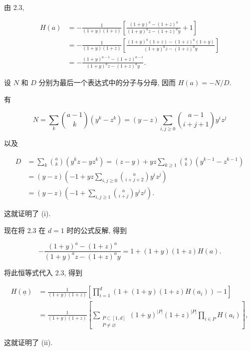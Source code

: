 由 2.3,

\begin{align*}
H(a)
&=-\frac{1}{(1+y)(1+z)}\left[
\frac{(1+y)^a-(1+z)^a}{(1+y)^az-(1+z)^ay}+1\right]\\
&=-\frac{1}{(1+y)(1+z)}\left[
\frac{(1+y)^a(1+z)-(1+z)^a(1+y)}
{(1+y)^az-(1+z)^ay}\right]\\
&=-\frac{(1+y)^{a-1}-(1+z)^{a-1}}
{(1+y)^az-(1+z)^ay}.
\end{align*}

设 $N$ 和 $D$ 分别为最后一个表达式中的分子与分母, 因而 $H(a)=-N/D$.


有

\begin{equation*}
N=\sum_k\binom{a-1}{k}(y^k-z^k)
=(y-z)\sum_{i,j\geq0}\binom{a-1}{i+j+1}y^iz^j
\end{equation*}

以及

\begin{align*}
D
&=\sum_k\binom ak(y^kz-yz^k)
=(z-y)+yz\sum_{k\geq1}\binom ak(y^{k-1}-z^{k-1})\\
&=(y-z)\left(-1+yz\sum_{i,j\geq0}
\binom a{i+j+2}y^iz^j\right)\\
&=(y-z)\left(-1+\sum_{i,j\geq1}
\binom a{i+j}y^iz^j\right).
\end{align*}

这就证明了 (i).

现在将 2.3 在 $d=1$ 时的公式反解, 得到

\begin{equation*}
-\frac{(1+y)^a-(1+z)^a}{(1+y)^az-(1+z)^ay}
=1+(1+y)(1+z)H(a).
\end{equation*}

将此恒等式代入 2.3, 得到

\begin{align*}
H(\underline a)
&=\frac{1}{(1+y)(1+z)}\left[
\prod_{i=1}^d\left(1+(1+y)(1+z)H(a_i)\right)-1\right]\\
&=\frac{1}{(1+y)(1+z)}\left[
\sum_{\substack{P\subset[1,d]\\P\ne\varnothing}}
(1+y)^{|P|}(1+z)^{|P|}\prod_{i\in P}H(a_i)\right],
\end{align*}

这就证明了 (ii).
